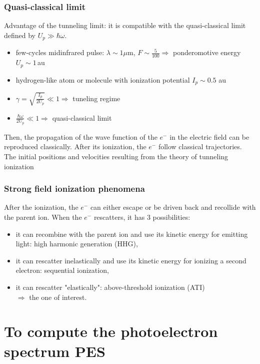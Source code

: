 \documentclass{beamer}
\begin{document}
\begin{frame}
\frametitle{Quasi-classical limit}
Advantage of the tunneling limit: it is compatible with the quasi-classical limit defined by $U_{p}\gg\hbar\omega$.
\begin{itemize}
\item
few-cycles midinfrared pulse: $\lambda\sim 1 \mu$m, $F\sim \frac{5}{100} \Rightarrow$ ponderomotive energy $U_{p}\sim 1\,$au
\item
hydrogen-like atom or molecule with ionization potential $I_{p}\sim 0.5$ au
\item
$\gamma=\sqrt{\frac{I_{p}}{2U_{p}}} \ll 1 \Rightarrow$ tuneling regime
\item
$\frac{\hbar\omega}{2U_{p}}\ll 1 \Rightarrow$ quasi-classical limit
\end{itemize}
Then, the propagation of the wave function of the $e^{-}$ in the electric field can be reproduced classically.
After its ionization, the $e^{-}$ follow classical trajectories. The initial positions and velocities resulting from the theory of tunneling ionization

\end{frame}


\begin{frame}
\frametitle{Strong field ionization phenomena}
After the ionization, the $e^{-}$ can either escape or be driven back and recollide with the parent ion.
When the $e^{-}$ rescatters, it has $3$ possibilities:
\begin{itemize}
\item
it can recombine with the parent ion and use its kinetic energy for emitting light: high harmonic generation (HHG),
\item
it can rescatter inelastically and use its kinetic energy for ionizing a second electron: sequential ionization,
\item
it can rescatter "elastically": above-threshold ionization (ATI) \\ 
$\Rightarrow$ the one of interest.
\end{itemize}
\end{frame}

\section{To compute the photoelectron spectrum PES}
\end{document}
